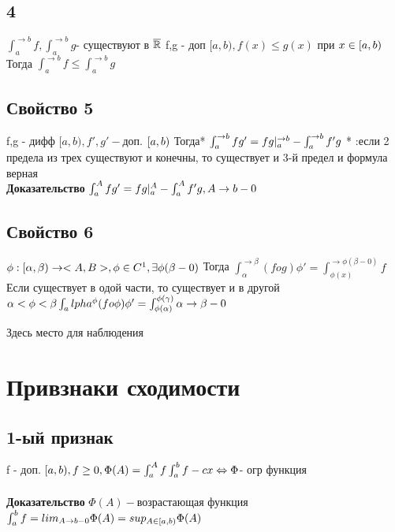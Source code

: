 \documentclass[12pt, a4paper]{article}
\begin{document}
	\subsection{4}
	$  \int_a^{\rightarrow b} f,  \int_a^{\rightarrow b} g $- существуют в $ \overline{\mathbb{R}} \\$
	f,g - доп $ [a, b), f(x) \leq  g(x) $ при  $ x \in [a,b) \\$
	Тогда $  \int_a^{\rightarrow b} f \leq  \int_a^{\rightarrow b} g  $
	\subsection{Свойство 5}
	f,g -   дифф $ [a, b), f' , g' - $доп. $ [a,b) \\$
	Тогда* $  \int_a^{\rightarrow b} f g' = f g |_a^{\rightarrow b} - \int_a^{\rightarrow b} f' g \\$
	* :если  2 предела  из трех существуют и конечны, то существует и 3-й предел  и формула верная \\
	\textbf{Доказательство}
	$  \int_a^A f g' = f g |_a^A - \int_a^A f' g , A \rightarrow b -0 \\ $
	\subsection{Свойство 6}
	$ \phi : [\alpha, \beta) \rightarrow <A,B >, \phi \in C^1,  \exists \phi (\beta - 0) \\$
	Тогда $  \int_\alpha^{\rightarrow \beta} (f o g)\phi' = \int_{\phi(x)}^{\rightarrow\phi(\beta - 0)}  f$ 	Если существует в одой части, то существует и в другой\\
	$ \alpha < \phi <  \beta \\
	\int_alpha^\phi (f o \phi) \phi' = \int_{\phi(\alpha)}^{\phi(\gamma)}\\
	\alpha \rightarrow  \beta -0 \\$
	
	Здесь место для наблюдения  \\
	\section{Привзнаки сходимости}
	\subsection{1-ый признак}
	f - доп. $ [a,b), f\geq 0, \Phi(A) =\int_a^A f\\
	\int_a^b f -cx \Leftrightarrow \Phi $- огр функция\\
	\\
	\textbf{Доказательство}
	$ \Phi(A)- $возрастающая функция \\
	$ \int_a^b f = lim_{A \rightarrow b - 0} \Phi(A)= sup_{A \in [a,b)} \Phi (A)\\$
\end{document}
